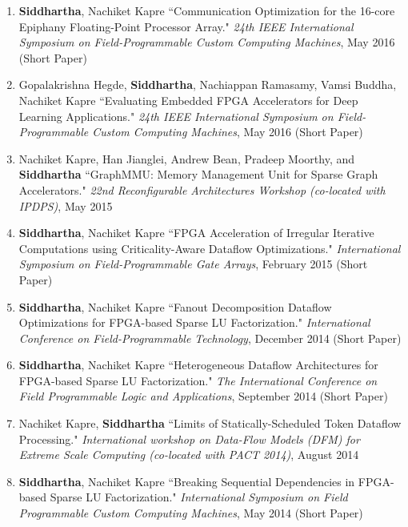 \documentclass[10pt]{article}
\begin{document}
\begin{enumerate}
    \item {\bf Siddhartha}, Nachiket Kapre ``Communication Optimization for the 16-core Epiphany Floating-Point Processor Array." \emph{24th IEEE International Symposium on Field-Programmable Custom Computing Machines}, May 2016 (Short Paper)
    \item Gopalakrishna Hegde, {\bf Siddhartha}, Nachiappan Ramasamy, Vamsi Buddha, Nachiket Kapre ``Evaluating Embedded FPGA Accelerators for Deep Learning Applications." \emph{24th IEEE International Symposium on Field-Programmable Custom Computing Machines}, May 2016 (Short Paper)
    \item Nachiket Kapre, Han Jianglei, Andrew Bean, Pradeep Moorthy, and {\bf Siddhartha} ``GraphMMU: Memory Management Unit for Sparse Graph Accelerators." \emph{22nd Reconfigurable Architectures Workshop (co-located with IPDPS)}, May 2015
    \item {\bf Siddhartha}, Nachiket Kapre ``FPGA Acceleration of Irregular Iterative Computations using Criticality-Aware Dataflow Optimizations." \emph{International Symposium on Field-Programmable Gate Arrays}, February 2015 (Short Paper)
    \item {\bf Siddhartha}, Nachiket Kapre ``Fanout Decomposition Dataflow Optimizations for FPGA-based Sparse LU Factorization." \emph{International Conference on Field-Programmable Technology}, December 2014 (Short Paper)
    \item {\bf Siddhartha}, Nachiket Kapre ``Heterogeneous Dataflow Architectures for FPGA-based Sparse LU Factorization." \emph{The International Conference on Field Programmable Logic and Applications}, September 2014 (Short Paper)
    \item Nachiket Kapre, {\bf Siddhartha} ``Limits of Statically-Scheduled Token Dataflow Processing." \emph{International workshop on Data-Flow Models (DFM) for Extreme Scale Computing (co-located with PACT 2014)}, August 2014
    \item {\bf Siddhartha}, Nachiket Kapre ``Breaking Sequential Dependencies in FPGA-based Sparse LU Factorization." \emph{International Symposium on Field Programmable Custom Computing Machines}, May 2014 (Short Paper)
\end{enumerate}
\end{document}

